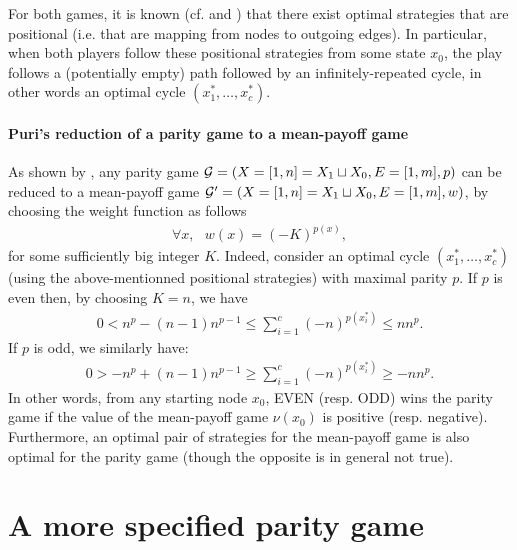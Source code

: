 \documentclass{article}
\def\G{{\cal G}}
\begin{document}
For both games, it is known (cf. \citet{zielonka98} and \citet{ehrenfeucht79}) that there exist optimal strategies that are positional (i.e. that are mapping from nodes to outgoing edges). In particular, when both players follow these positional strategies from some state $x_0$, the play follows a (potentially empty) path followed by an infinitely-repeated cycle, in other words an optimal cycle $(x^*_1,\dots,x^*_c)$.

\paragraph{Puri's reduction of a parity game to a mean-payoff game}

As shown by \citet{puri96}, any parity game $\G=(X=[1,n]=X_1 \sqcup X_0,E=[1,m],p)$ can be reduced to a mean-payoff game $\G'=(X=[1,n]=X_1 \sqcup X_0,E=[1,m],w)$, by choosing the weight function as follows
\begin{align}
  \forall x,~~~ w(x) = (-K)^{p(x)},
\end{align}
for some sufficiently big integer $K$.
Indeed, consider an optimal cycle $(x^*_1,\dots,x^*_c)$ (using the above-mentionned positional strategies) with maximal parity $p$. If $p$ is even then, by choosing $K=n$, we have
\begin{align}
 0 <  n^{p} - (n-1) n^{p-1} \le  \sum_{i=1}^{c} (-n)^{p(x^*_i)} \le n n^{p}.
\end{align}
If $p$ is odd, we similarly have:
\begin{align}
0 > -n^{p} + (n-1) n^{p-1} \ge   \sum_{i=1}^{c} (-n)^{p(x^*_i)} \ge -n n^{p}.
\end{align}
In other words, from any starting node $x_0$, EVEN (resp. ODD) wins the parity game if the value of the mean-payoff game $\nu(x_0)$ is positive (resp. negative). Furthermore, an optimal pair of strategies for the mean-payoff game is also optimal for the parity game (though the opposite is in general not true).

\section{A more specified parity game}
\end{document}
